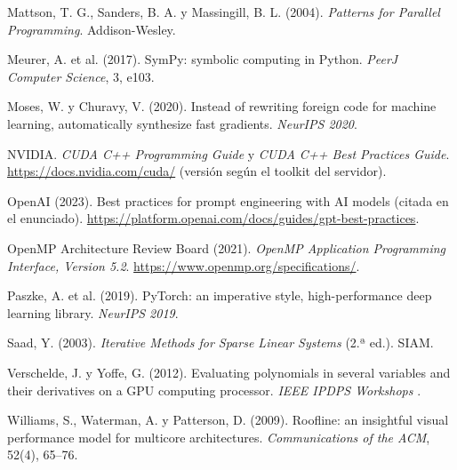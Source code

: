 {\begin{enumerate}[leftmargin=*,label={[\arabic*]}]
\item Mattson, T. G., Sanders, B. A. y Massingill, B. L. (2004). \emph{Patterns for Parallel Programming}. Addison-Wesley.
\item Meurer, A. et al. (2017). SymPy: symbolic computing in Python. \emph{PeerJ Computer Science}, 3, e103.
\item Moses, W. y Churavy, V. (2020). Instead of rewriting foreign code for machine learning, automatically synthesize fast gradients. \emph{NeurIPS 2020}.
\item NVIDIA. \emph{CUDA C++ Programming Guide} y \emph{CUDA C++ Best Practices Guide}. \url{https://docs.nvidia.com/cuda/} (versión según el toolkit del servidor).
\item OpenAI (2023). Best practices for prompt engineering with AI models (citada en el enunciado). \url{https://platform.openai.com/docs/guides/gpt-best-practices}.
\item OpenMP Architecture Review Board (2021). \emph{OpenMP Application Programming Interface, Version 5.2}. \url{https://www.openmp.org/specifications/}.
\item Paszke, A. et al. (2019). PyTorch: an imperative style, high-performance deep learning library. \emph{NeurIPS 2019}.
\item Saad, Y. (2003). \emph{Iterative Methods for Sparse Linear Systems} (2.ª ed.). SIAM.
\item Verschelde, J. y Yoffe, G. (2012). Evaluating polynomials in several variables and their derivatives on a GPU computing processor. \emph{IEEE IPDPS Workshops} \pv.
\item Williams, S., Waterman, A. y Patterson, D. (2009). Roofline: an insightful visual performance model for multicore architectures. \emph{Communications of the ACM}, 52(4), 65--76.
\end{enumerate}
}
